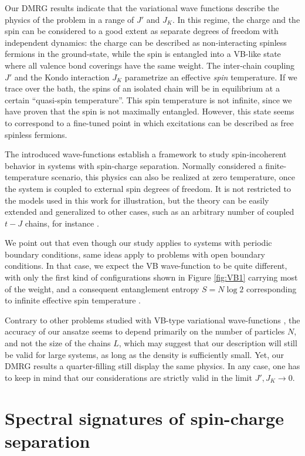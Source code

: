 \documentclass[article,11pt]{revtex4}
\begin{document}
Our DMRG results indicate that the variational wave functions describe the physics of the problem in a range of $J'$ and $J_K$. In this regime, the charge and the spin can be considered to a good extent as separate degrees of freedom with independent dynamics: the charge can be described as non-interacting spinless fermions in the ground-state, while the spin is entangled into a VB-like state where all valence bond coverings have the same weight. The inter-chain coupling $J'$ and the Kondo interaction $J_K$ parametrize an effective {\it spin} temperature. If we trace over the bath, the spins of an isolated chain will be in equilibrium at a certain ``quasi-spin temperature''. This spin temperature is not infinite, since we have proven that the spin is not maximally entangled. However, this state seems to correspond to a fine-tuned point in which excitations can be described as free spinless fermions.

The introduced wave-functions establish a framework to study spin-incoherent behavior in systems with spin-charge separation. Normally considered a finite-temperature scenario, this physics can also be realized at zero temperature, once the system is coupled to external spin degrees of freedom. It is not restricted to the models used in this work for illustration, but the theory can be easily extended and generalized to other cases, such as an arbitrary number of coupled $t-J$ chains, for instance \cite{Anderson1990,Putikka1994}. 

We point out that even though our study applies to systems with periodic boundary conditions, same ideas apply to problems with open boundary conditions. In that case, we expect the VB wave-function to be quite different, with only the first kind of configurations shown in Figure \ref{fig:VB1} carrying most of the weight, and a consequent entanglement entropy $S=N\log{2}$ corresponding to infinite effective spin temperature \cite{Feiguin2011}. 

Contrary to other problems studied with VB-type variational wave-functions \cite{Sandvik2012}, the accuracy of our ansatze seems to depend primarily on the number of particles $N$, and not the size of the chains $L$, which may suggest that our description will still be valid for large systems, as long as the density is sufficiently small. Yet, our DMRG results a quarter-filling still display the same physics. In any case, one has to keep in mind that our considerations are strictly valid in the limit $J',J_K\rightarrow 0$.
\pagebreak
\section {Spectral signatures of spin-charge separation}
\end{document}
